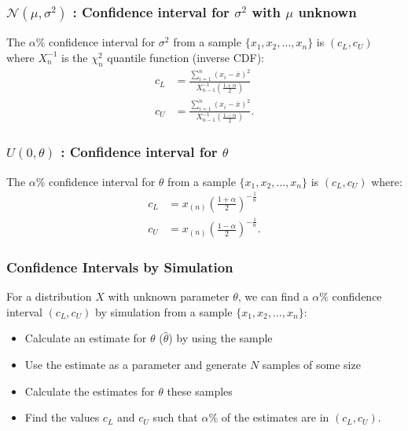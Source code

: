 \documentclass[a4paper, 12pt, twoside]{article}
\begin{document}
\subsubsection{$\mathcal{N}(\mu, \sigma^2)$ : Confidence
    interval for $\sigma^2$ with $\mu$ unknown}

The $\alpha\%$ confidence interval for $\sigma^2$ from a sample
$\{x_1, x_2, \ldots, x_n\}$ is $(c_L, c_U)$ where $X_n^{-1}$ is the
$\chi^2_n$ quantile function (inverse CDF):
\begin{align*}
    c_L & = \frac{\sum_{i = 1}^n(x_i - \overline{x})^2}
    {X_{n-1}^{-1}\left(\frac{1 + \alpha}{2}\right)}     \\
    c_U & = \frac{\sum_{i = 1}^n(x_i - \overline{x})^2}
    {X_{n-1}^{-1}\left(\frac{1 - \alpha}{2}\right)}.
\end{align*}

\subsubsection{$U(0, \theta)$ : Confidence interval for $\theta$}

The $\alpha\%$ confidence interval for $\theta$ from a sample
$\{x_1, x_2, \ldots, x_n\}$ is $(c_L, c_U)$ where:
\begin{align*}
    c_L & = x_{(n)}\left(\frac{1 + \alpha}{2}\right)^{-\frac{1}{n}}  \\
    c_U & = x_{(n)}\left(\frac{1 - \alpha}{2}\right)^{-\frac{1}{n}}.
\end{align*}

\subsubsection{Confidence Intervals by Simulation}

For a distribution $X$ with unknown parameter $\theta$, we can
find a $\alpha\%$ confidence interval $(c_L, c_U)$ by simulation from
a sample $\{x_1, x_2, \ldots, x_n\}$:

\begin{itemize}
    \item Calculate an estimate for $\theta$ ($\hat\theta$) by using the
          sample
    \item Use the estimate as a parameter and generate $N$ samples of
          some size
    \item Calculate the estimates for $\theta$ these samples
    \item Find the values $c_L$ and $c_U$ such that $\alpha\%$ of
          the estimates are in $(c_L, c_U)$.
\end{itemize}
\end{document}
